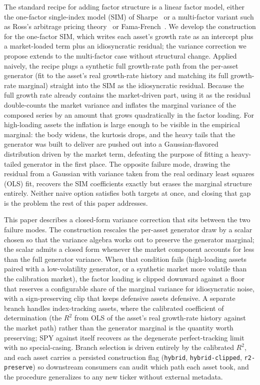 The standard recipe for adding factor structure is a linear factor
model, either the one-factor single-index model (SIM) of
Sharpe~\cite{sharpe1963} or a multi-factor variant such as Ross's
arbitrage pricing theory~\cite{rossAPT1976} or
Fama-French~\cite{famaFrench1993}. We develop the construction for
the one-factor SIM, which writes each asset's growth rate as an
intercept plus a market-loaded term plus an idiosyncratic residual;
the variance correction we propose extends to the multi-factor case
without structural change. Applied naively, the recipe plugs a
synthetic full growth-rate path from the per-asset generator (fit
to the asset's real growth-rate history and matching its full
growth-rate marginal) straight into the SIM as the idiosyncratic residual.
Because the full growth rate already contains the market-driven part,
using it as the residual double-counts the market variance and
inflates the marginal variance of the composed series by an amount
that grows quadratically in the factor loading. For high-loading
assets the inflation is large enough to be visible in the empirical
marginal: the body widens, the kurtosis drops, and the heavy tails
that the generator was built to deliver are pushed out into a
Gaussian-flavored distribution driven by the market term, defeating
the purpose of fitting a heavy-tailed generator in the first place.
The opposite failure mode, drawing the residual from a Gaussian with
variance taken from the real ordinary least squares (OLS) fit,
recovers the SIM coefficients exactly but erases the marginal
structure entirely. Neither naive option satisfies both targets at
once, and closing that gap is the problem the rest of this paper
addresses.

This paper describes a closed-form variance correction that sits
between the two failure modes. The construction rescales the
per-asset generator draw by a scalar chosen so that the variance
algebra works out to preserve the generator marginal; the scalar
admits a closed form whenever the market component accounts for
less than the full generator variance. When that condition fails
(high-loading assets paired with a low-volatility generator, or a
synthetic market more volatile than the calibration market), the
factor loading is clipped downward against a floor that reserves a
configurable share of the marginal variance for idiosyncratic
noise, with a sign-preserving clip that keeps defensive assets
defensive. A separate branch handles index-tracking assets, where
the calibrated coefficient of determination (the $R^2$ from OLS of
the asset's real growth-rate history against the market path)
rather than the generator marginal is the quantity worth preserving;
SPY against itself recovers as the degenerate perfect-tracking
limit with no special-casing. Branch
selection is driven entirely by the calibrated $R^2$, and each
asset carries a persisted construction flag (\texttt{hybrid},
\texttt{hybrid-clipped}, \texttt{r2-preserve}) so downstream
consumers can audit which path each asset took, and the procedure
generalizes to any new ticker without external metadata.


